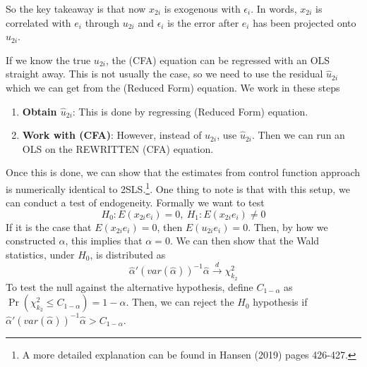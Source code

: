 So the key takeaway is that now $x_{2i}$ is exogenous with $\epsilon_i$. In words, $x_{2i}$ is correlated with $e_i$ through $u_{2i}$ and $\epsilon_i$ is the error after $e_i$ has been projected onto $u_{2i}$.  \par
If we know the true $u_{2i}$, the (CFA) equation can be regressed with an OLS straight away. This is not usually the case, so we need to use the residual $\hat{u}_{2i}$ which we can get from the (Reduced Form) equation. We work in these steps
\begin{enumerate}
\item \textbf{Obtain $\hat{u}_{2i}$}: This is done by regressing (Reduced Form) equation. 
\item \textbf{Work with (CFA)}: However, instead of $u_{2i}$, use $\hat{u}_{2i}$. Then we can run an OLS on the REWRITTEN (CFA) equation. 
\end{enumerate}\par
Once this is done, we can show that the estimates from control function approach is numerically identical to 2SLS.\footnote{A more detailed explanation can be found in Hansen (2019) pages 426-427.}. 
One thing to note is that with this setup, we can conduct a test of endogeneity. Formally we want to test
\[
H_0: E(x_{2i}e_i)=0, \ H_1:E(x_{2i}e_i)\neq0
\]
If it is the case that $E(x_{2i}e_i)=0$, then $E(u_{2i}e_i)=0$. Then, by how we constructed $\alpha$, this implies that $\alpha=0$. We can then show that the Wald statistics, under $H_0$, is distributed as
\[
\hat{\alpha}'(var(\hat{\alpha}))^{-1}\hat{\alpha}\xrightarrow{d}\chi^2_{k_2}
\]
To test the null against the alternative hypothesis, define $C_{1-\alpha}$ as $\Pr(\chi_{k_2}^2\leq C_{1-\alpha})=1-\alpha$. Then, we can reject the $H_0$ hypothesis if $\hat{\alpha}'(var(\hat{\alpha}))^{-1}\hat{\alpha}>C_{1-\alpha}$.

